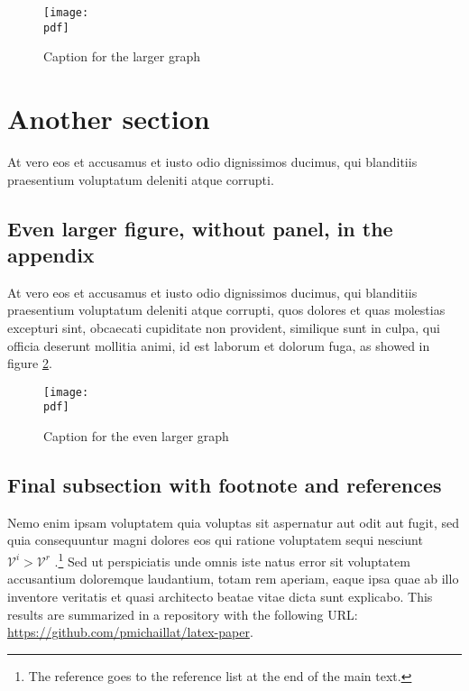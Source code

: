 \documentclass[letterpaper,11pt,leqno]{article}
\newcommand{\pdf}{figures.pdf}
\begin{document}
\begin{figure}[t]
\texttt{[image: \\pdf]}
\caption{Caption for the larger graph}
\label{f:appendix1}\end{figure}

\section{Another section}\label{a:appendix2}

At vero eos et accusamus et iusto odio dignissimos ducimus, qui blanditiis praesentium voluptatum deleniti atque corrupti.

\subsection{Even larger figure, without panel, in the appendix} 

At vero eos et accusamus et iusto odio dignissimos ducimus, qui blanditiis praesentium voluptatum deleniti atque corrupti, quos dolores et quas molestias excepturi sint, obcaecati cupiditate non provident, similique sunt in culpa, qui officia deserunt mollitia animi, id est laborum et dolorum fuga, as showed in figure \ref{f:appendix2}.

\begin{figure}[t]
\texttt{[image: \\pdf]}
\caption{Caption for the even larger graph}
\label{f:appendix2}\end{figure}


\subsection{Final subsection with footnote and references}\label{a:subappendix}

Nemo enim ipsam voluptatem quia voluptas sit aspernatur aut odit aut fugit, sed quia consequuntur magni dolores eos qui ratione voluptatem sequi nesciunt $\mathcal{V}^i > \mathcal{V}^r$ \citep{MS21b}.\footnote{The reference goes to the reference list at the end of the main text.} Sed ut perspiciatis unde omnis iste natus error sit voluptatem accusantium doloremque laudantium, totam rem aperiam, eaque ipsa quae ab illo inventore veritatis et quasi architecto beatae vitae dicta sunt explicabo. This results are summarized in a repository with the following URL: \url{https://github.com/pmichaillat/latex-paper}.
\end{document}
